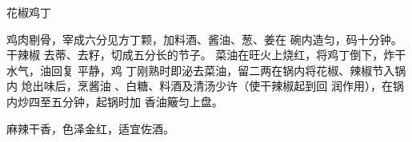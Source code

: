 \begin{recipe}{花椒鸡丁}

\ingredients



\preparation

鸡肉剔骨，宰成六分见方丁颗，加料酒、酱油、葱、姜在 碗内造匀，码十分钟。干辣椒
去蒂、去籽，切成五分长的节子。 菜油在旺火上烧红，将鸡丁倒下，炸干水气，油回复
平静，鸡 丁刚熟时即泌去菜油，留二两在锅内将花椒、辣椒节入锅内 炝出味后，烹酱油
、白糖、料酒及清汤少许（使干辣椒起到回 润作用），在锅内炒四至五分钟，起锅时加
香油簸匀上盘。

\features

麻辣干香，色泽金红，适宜佐酒。

\end{recipe}

